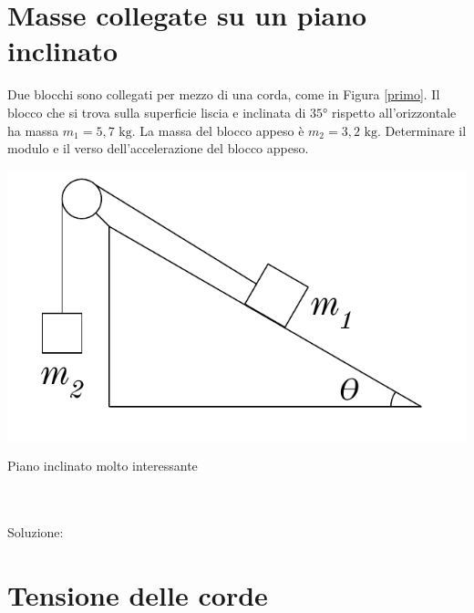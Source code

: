 \section{Masse collegate su un piano inclinato}
Due blocchi sono collegati per mezzo di una corda, come in Figura \ref{primo}.
Il blocco che si trova sulla superficie liscia e inclinata di $35$° rispetto
all'orizzontale ha massa $m_1 = 5,7\text{ kg}$. La massa del blocco appeso
è $m_2 = 3,2\text{ kg}$. Determinare il modulo e il verso dell'accelerazione
del blocco appeso.
\begin{marginfigure}
    \centering
    \includegraphics[width = \marginparwidth]{figures/carrucolainclinata.pdf}
    \caption{Piano inclinato molto interessante}
    \label{primo}
\end{marginfigure}
\\\\
\noindent Soluzione:

\section{Tensione delle corde}
